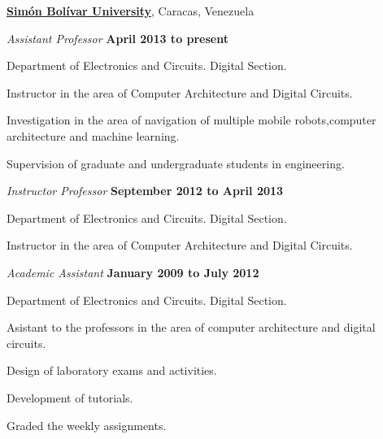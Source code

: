 \documentclass[10pt]{article}
\begin{document}
\href{http://www.usb.ve/}{\textbf{Simón Bolívar University}}, Caracas, Venezuela
\begin{outerlist}
    \item[] \textit{Assistant Professor}%
            \hfill \textbf{April 2013 to present}
            \begin{innerlist}
                \item Department of Electronics and Circuits. Digital Section.
                \item Instructor in the area of Computer Architecture and Digital Circuits.
                \item Investigation in the area of navigation of multiple mobile
                robots,computer architecture and machine learning.
                \item Supervision of graduate and undergraduate students in engineering.
            \end{innerlist}

    \item[] \textit{Instructor Professor}%
            \hfill \textbf{September 2012 to April 2013}
            \begin{innerlist}
                \item Department of Electronics and Circuits. Digital Section.
                \item Instructor in the area of Computer Architecture and Digital Circuits.
            \end{innerlist}

    \item[] \textit{Academic Assistant}%
            \hfill \textbf{January 2009 to July 2012}
            \begin{innerlist}
                \item Department of Electronics and Circuits. Digital Section.
                \item Asistant to the professors in the area of computer architecture
                and digital circuits.
                \item Design of laboratory exams and activities.
                \item Development of tutorials.
                \item Graded the weekly assignments.
            \end{innerlist}
\end{outerlist}
\end{document}
